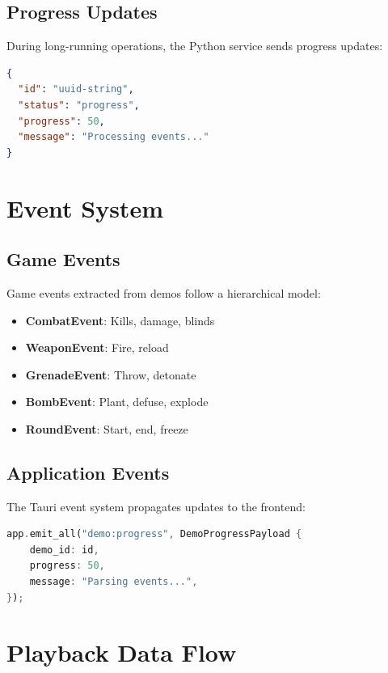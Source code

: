 \subsection{Progress Updates}

During long-running operations, the Python service sends progress updates:

\begin{lstlisting}[language=json]
{
  "id": "uuid-string",
  "status": "progress",
  "progress": 50,
  "message": "Processing events..."
}
\end{lstlisting}

\section{Event System}

\subsection{Game Events}

Game events extracted from demos follow a hierarchical model:

\begin{itemize}
    \item \textbf{CombatEvent}: Kills, damage, blinds
    \item \textbf{WeaponEvent}: Fire, reload
    \item \textbf{GrenadeEvent}: Throw, detonate
    \item \textbf{BombEvent}: Plant, defuse, explode
    \item \textbf{RoundEvent}: Start, end, freeze
\end{itemize}

\subsection{Application Events}

The Tauri event system propagates updates to the frontend:

\begin{lstlisting}[language=Rust]
app.emit_all("demo:progress", DemoProgressPayload {
    demo_id: id,
    progress: 50,
    message: "Parsing events...",
});
\end{lstlisting}

\section{Playback Data Flow}

